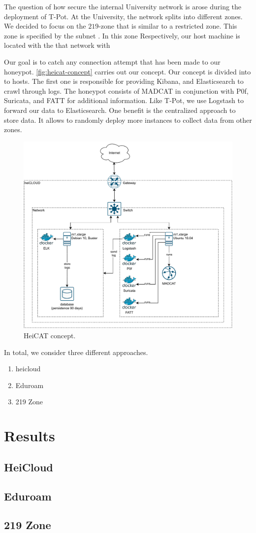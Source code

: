 The question of how secure the internal University network is arose during the deployment of T-Pot.
At the University, the network splits into different zones.
We decided to focus on the $219$-zone that is similar to a restricted zone.
This zone is specified by the subnet .
In this zone 
Respectively, our host machine is located with the that network with 

Our goal is to catch any connection attempt that has been made to our honeypot.
\autoref{fig:heicat-concept} carries out our concept.
Our concept is divided into to hosts.
The first one is responsible for providing Kibana, and Elasticsearch to crawl through logs.
The honeypot consists of MADCAT in conjunction with P0f, Suricata, and FATT for additional information.
Like T-Pot, we use Logstash to forward our data to Elasticsearch.
One benefit is the centralized approach to store data.
It allows to randomly deploy more instances to collect data from other zones.

\begin{figure}[ht]
    \centering
    \includegraphics[width=\textwidth]{figures/heicat-conecpt.pdf}
    \caption[HeiCAT concept]{HeiCAT concept.}
    \label{fig:heicat-concept}
\end{figure}

In total, we consider three different approaches.
\begin{enumerate}
    \item heicloud
    \item Eduroam
    \item 219 Zone
\end{enumerate}

\section{Results}

\subsection{HeiCloud}

\subsection{Eduroam}

\subsection{219 Zone}
